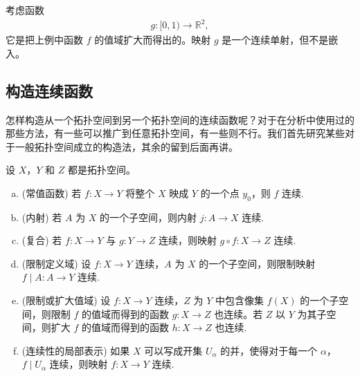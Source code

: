 \documentclass[../../main.tex]{subfiles}
\begin{document}
\begin{example}\label{example:ch02-非嵌入}
考虑函数
\begin{align*}
g: [0, 1) \rightarrow \mathbb{R}^{2},
\end{align*}
它是把上例中函数 $f$ 的值域扩大而得出的。映射 $g$ 是一个连续单射，但不是嵌入。
\end{example}

\subsection*{构造连续函数}

怎样构造从一个拓扑空间到另一个拓扑空间的连续函数呢？对于在分析中使用过的那些方法，有一些可以推广到任意拓扑空间，有一些则不行。我们首先研究某些对于一般拓扑空间成立的构造法，其余的留到后面再讲。

\begin{theorem}[构造连续函数的法则]\label{theorem:ch02-连续构造法则}
设 $X$，$Y$ 和 $Z$ 都是拓扑空间。
\begin{enumerate}[(a)]
\item (常值函数) 若 $f: X \rightarrow Y$ 将整个 $X$ 映成 $Y$ 的一个点 $y_{0}$，则 $f$ 连续.
\item (内射) 若 $A$ 为 $X$ 的一个子空间，则内射 $j: A \rightarrow X$ 连续.
\item (复合) 若 $f: X \rightarrow Y$ 与 $g: Y \rightarrow Z$ 连续，则映射 $g \circ f: X \rightarrow Z$ 连续.
\item (限制定义域) 设 $f: X \rightarrow Y$ 连续，$A$ 为 $X$ 的一个子空间，则限制映射 $f \mid A: A \rightarrow Y$ 连续.
\item (限制或扩大值域) 设 $f: X \rightarrow Y$ 连续，$Z$ 为 $Y$ 中包含像集 $f(X)$ 的一个子空间，则限制 $f$ 的值域而得到的函数 $g: X \rightarrow Z$ 也连续。若 $Z$ 以 $Y$ 为其子空间，则扩大 $f$ 的值域而得到的函数 $h: X \rightarrow Z$ 也连续.
\item (连续性的局部表示) 如果 $X$ 可以写成开集 $U_{\alpha}$ 的并，使得对于每一个 $\alpha$，$f \mid U_{\alpha}$ 连续，则映射 $f: X \rightarrow Y$ 连续.
\end{enumerate}
\end{theorem}
\end{document}
